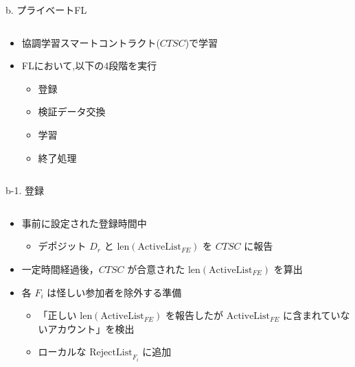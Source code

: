 \documentclass[unicode,12pt,aspectratio=169, dvipdfmx]{beamer}
\begin{document}
\begin{frame}{b. プライベートFL}
    \begin{columns}
        \begin{column}[T]{.7\linewidth}
            \begin{itemize}
                \item 協調学習スマートコントラクト($CTSC$)で学習
                \item FLにおいて,以下の4段階を実行
                  \begin{itemize}
                    \item 登録
                    \item 検証データ交換
                    \item 学習
                    \item 終了処理
                  \end{itemize}
            \end{itemize}
        \end{column}
    \end{columns}
\end{frame}


\begin{frame}{b-1. 登録}
    \begin{columns}
        \begin{column}[T]{.7\linewidth}
            \begin{itemize}
                \item 事前に設定された登録時間中
                  \begin{itemize}
                    \item デポジット $D_r$ と $\mathrm{len}(\mathrm{ActiveList}_{FE})$ を $CTSC$ に報告
                  \end{itemize}
                \item 一定時間経過後，$CTSC$ が合意された $\mathrm{len}(\mathrm{ActiveList}_{FE})$ を算出
                \item 各 $F_i$ は怪しい参加者を除外する準備
                  \begin{itemize}
                    \item 「正しい $\mathrm{len}(\mathrm{ActiveList}_{FE})$ を報告したが $\mathrm{ActiveList}_{FE}$ に含まれていないアカウント」を検出
                    \item ローカルな $\mathrm{RejectList}_{F_i}$ に追加
                  \end{itemize}
            \end{itemize}
        \end{column}
    \end{columns}
\end{frame}
\end{document}
